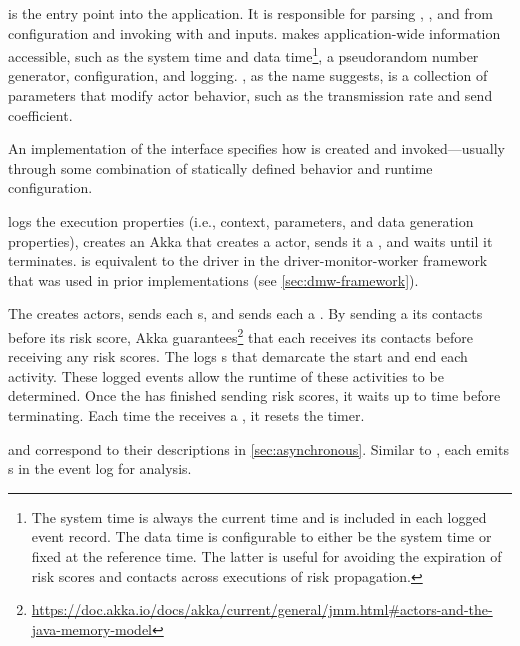  is the entry point into the application. It is responsible for parsing , , and  from configuration and invoking   with  and  inputs.  makes  application-wide information accessible, such as the system time and data time\footnote{The system time is always the current time and is included in each logged event record. The data time is configurable to either be the system time or fixed at the reference time. The latter is useful for avoiding the expiration of risk scores and contacts across executions of risk propagation.}, a pseudorandom number generator,  configuration, and logging. , as the name suggests, is a collection of parameters that modify actor behavior, such as the transmission rate and send coefficient.

An implementation of the  interface specifies how  is created and invoked---usually through some combination of statically defined behavior and runtime configuration.

 logs the execution properties (i.e., context, parameters, and data generation properties), creates an Akka  that creates a  actor, sends it a , and waits until it terminates.  is equivalent to the driver in the driver-monitor-worker framework that was used in prior implementations (see \cref{sec:dmw-framework}).

The  creates  actors, sends each  s, and sends each  a . By sending a  its contacts before its risk score, Akka guarantees\footnote{\url{https://doc.akka.io/docs/akka/current/general/jmm.html\#actors-and-the-java-memory-model}} that each  receives its contacts before receiving any risk scores. The  logs s that demarcate the start and end each activity. These logged events allow the runtime of these activities to be determined. Once the  has finished sending risk scores, it waits up to  time before terminating. Each time the  receives a , it resets the timer. 

 and  correspond to their descriptions in \cref{sec:asynchronous}. Similar to , each  emits s in the event log for analysis.

